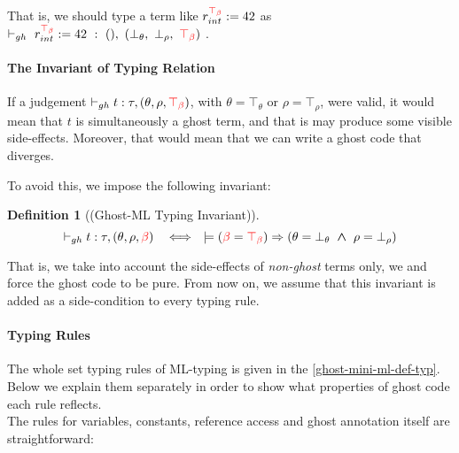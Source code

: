 \documentclass[a4paper,11pt,oneside]{article}
\theoremstyle{plain}
\newtheorem{definition}{Definition}[subsection]
\newcommand{\rouge}[1]{\textcolor{red}{#1}}
\newcommand{\bwedge}{\boldsymbol{~\wedge~}}
\newcommand{\ghosttyping}[6]{\vdash_{gh}~#1~:~#2,~(#3,~#4,~\rouge{#5})~\textcolor{blue}{\boldsymbol{#6}}}
\newcommand{\bth}{\bot_\theta}
\newcommand{\brh}{\bot_\rho}
\newcommand{\tth}{\top_\theta}
\newcommand{\trh}{\top_\rho}
\newcommand{\gb}{\beta}
\newcommand{\gbt}{\top_\beta}
\newcommand{\gbr}{\textcolor{red}{\gb}}
\newcommand{\gbtr}{\textcolor{red}{\gbt}}
\begin{document}
That is, we should type a term like $r_{int}^{\gbtr} := 42 $ as 
$\ghosttyping{r_{int}^{\gbtr} := 42}{()}{\bth}{\brh}{\gbtr}{}$.

\paragraph*{The Invariant of Typing Relation}	
	
If a judgement $\vdash_{gh} t : \tau, (\theta, \rho, \gbtr)$, with $\theta = \tth$ or $\rho = \trh $, were valid, it would mean that $t$ is simultaneously a ghost term, and that is may produce some visible side-effects. Moreover, that would mean that we can write a ghost code that diverges. 

To avoid this, we impose the following invariant:
\hypertarget{gh-typ-inv}{}
\begin{definition}[(Ghost-ML Typing Invariant)]
 $$\vdash_{gh} t : \tau, (\theta, \rho, \gbr) 
 ~~ \iff ~~
\models (\gbr = \gbtr) \Rightarrow (\theta = \bth \bwedge \rho = \brh) $$
\end{definition}   
That is, we take into account the side-effects of \textit{non-ghost} terms only, we and force the ghost code to be pure. 
From now on, we assume that this invariant is added as a side-condition to every typing rule.

\paragraph*{Typing Rules}	

The whole set typing rules of ML-typing is given in the \cref{ghost-mini-ml-def-typ}.
Below we explain them separately in order to show what properties of ghost code each rule reflects. \\

The rules for variables, constants, reference access and ghost annotation itself are straightforward:  
\end{document}
